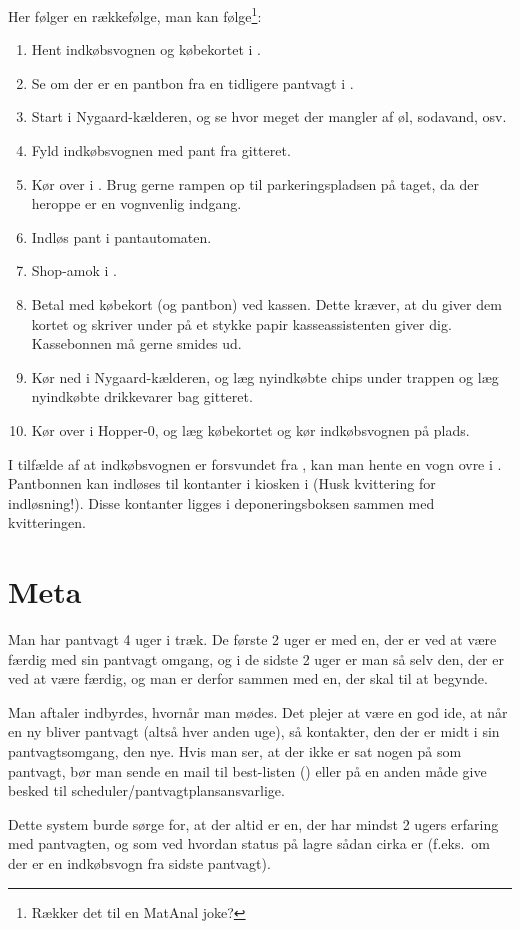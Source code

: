 Her følger en rækkefølge, man kan følge\footnote{Rækker det til en MatAnal joke?}:

\begin{enumerate}
\item Hent indkøbsvognen og købekortet i \shoppingcartloc.
\item Se om der er en pantbon fra en tidligere pantvagt i \shoppingcartloc.
\item Start i Nygaard-kælderen, og se hvor meget der mangler af øl,
  sodavand, osv.
\item Fyld indkøbsvognen med pant fra gitteret.
\item Kør over i \fotex. Brug gerne rampen op til parkeringspladsen på
  taget, da der heroppe er en vognvenlig indgang.
\item Indløs pant i pantautomaten.
\item Shop-amok i \fotex.
\item Betal med købekort (og pantbon) ved kassen. Dette kræver, at du
  giver dem kortet og skriver under på et stykke papir
  kasseassistenten giver dig. Kassebonnen må gerne smides ud.
\item Kør ned i Nygaard-kælderen, og læg nyindkøbte chips under
  trappen og læg nyindkøbte drikkevarer bag gitteret.
\item Kør over i Hopper-0, og læg købekortet og kør indkøbsvognen på plads.
\end{enumerate}

I tilfælde af at indkøbsvognen er forsvundet fra \shoppingcartloc, kan man hente en vogn ovre i \fotex.
Pantbonnen kan indløses til
kontanter i kiosken i \fotex (Husk kvittering for indløsning!). Disse
kontanter ligges i deponeringsboksen sammen med kvitteringen.

\section{Meta}
\label{sec:meta}

Man har pantvagt 4 uger i træk. De første 2 uger er med en, der er ved
at være færdig med sin pantvagt omgang, og i de sidste 2 uger er man
så selv den, der er ved at være færdig, og man er derfor sammen med
en, der skal til at begynde.

Man aftaler indbyrdes, hvornår man mødes. Det plejer at være en god
ide, at når en ny bliver pantvagt (altså hver anden uge), så
kontakter, den der er midt i sin pantvagtsomgang, den nye. Hvis man
ser, at der ikke er sat nogen på som pantvagt, bør man sende en mail
til best-listen () eller på en anden måde
give besked til scheduler/pantvagtplansansvarlige.

Dette system burde sørge for, at der altid er en, der har mindst 2
ugers erfaring med pantvagten, og som ved hvordan status på lagre
sådan cirka er (f.eks.\ om der er en indkøbsvogn fra sidste pantvagt).



